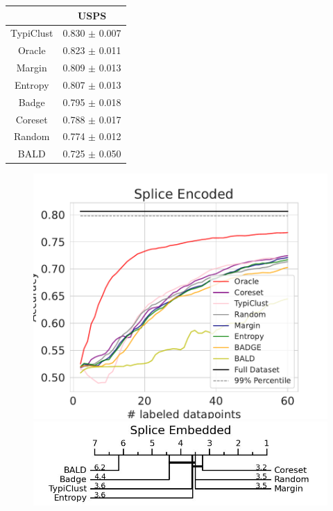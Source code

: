 \documentclass[]{article}
\begin{document}
\begin{minipage}{0.29\linewidth}
\begin{tabular}{c|c}
&USPS\\
\hline
TypiClust&0.830 $\pm$ 0.007\\
Oracle&0.823 $\pm$ 0.011\\
Margin&0.809 $\pm$ 0.013\\
Entropy&0.807 $\pm$ 0.013\\
Badge&0.795 $\pm$ 0.018\\
Coreset&0.788 $\pm$ 0.017\\
Random&0.774 $\pm$ 0.012\\
BALD&0.725 $\pm$ 0.050\\
\end{tabular}
\end{minipage}
\begin{minipage}{0.65\linewidth}
\begin{figure}[H]
    \centering
    \includegraphics[width=\linewidth]{img/eval_splice_enc} \\ [2mm]
    \includegraphics[width=\linewidth]{img/micro_splice_enc.jpg}
\end{figure}
\end{minipage}
\end{document}
